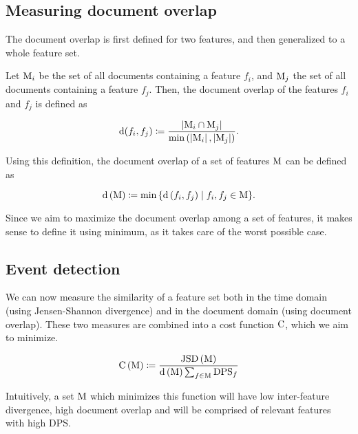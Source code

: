 \subsection{Measuring document overlap}

The document overlap is first defined for two features, and then generalized to a whole feature set.

Let $\text{M}_{i}$ be the set of all documents containing a feature $f_{i}$, and $\text{M}_{j}$ the set of all documents containing a feature $f_{j}$. Then, the document overlap of the features $f_{i}$ and $f_{j}$ is defined as

\begin{equation}
	\text{d}(f_{i}, f_{j}) \coloneqq \frac{\left\vert{\text{M}_{i} \cap \text{M}_{j}}\right\vert}{\min \left( {\left\vert{\text{M}_{i}}\right\vert, \left\vert{\text{M}_{j}}\right\vert} \right)}.
\end{equation}

Using this definition, the document overlap of a set of features $\text{M}$ can be defined as

\begin{equation}
	\text{d} \left( \text{M} \right) \coloneqq \min{\{ \text{d}\left( f_{i}, f_{j} \right) \mid f_{i}, f_{j} \in \text{M}\}}.
\end{equation}

Since we aim to maximize the document overlap among a set of features, it makes sense to define it using minimum, as it takes care of the worst possible case.


\subsection{Event detection}

We can now measure the similarity of a feature set both in the time domain (using Jensen-Shannon divergence) and in the document domain (using document overlap). These two measures are combined into a cost function $\text{C}$, which we aim to minimize.

\begin{equation} \label{eq:cost-function}
	\text{C} \left( \text{M} \right) \coloneqq \frac{\text{JSD} \left( \text{M} \right)}{\text{d} \left( \text{M} \right) \sum_{f \in \text{M}}{\text{DPS}_{f}}}
\end{equation}

Intuitively, a set $\text{M}$ which minimizes this function will have low inter-feature divergence, high document overlap and will be comprised of relevant features with high DPS.

